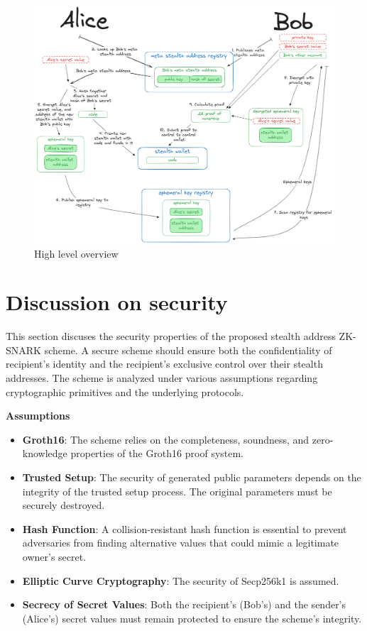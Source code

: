 \documentclass[conference,comsoc,10pt]{IEEEtran}
\begin{document}
    \begin{figure}[h]
        \centering
        \includegraphics[scale=0.11]{../bachelor/assets/images/high-level-flow.png}
        \caption{High level overview}
        \label{fig:high-level-flow}
    \end{figure}

\section{Discussion on security}

    This section discuses the security properties of the proposed stealth address
    ZK-SNARK scheme. A secure scheme should ensure both the confidentiality
    of recipient's identity and the recipient's exclusive control over their
    stealth addresses. The scheme is analyzed under various assumptions
    regarding cryptographic primitives and the underlying protocols.

    \textbf{Assumptions}
    \begin{itemize}
        \item \textbf{Groth16}: The scheme relies on the completeness, soundness,
            and zero-knowledge properties of the Groth16 proof system.
        \item \textbf{Trusted Setup}: The security of generated public parameters
            depends on the integrity of the trusted setup process. The original
            parameters must be securely destroyed.
        \item \textbf{Hash Function}: A collision-resistant hash function is
            essential to prevent adversaries from finding alternative values
            that could mimic a legitimate owner's secret.
        \item \textbf{Elliptic Curve Cryptography}: The security of Secp256k1 is
            assumed.
        \item \textbf{Secrecy of Secret Values}: Both the recipient's (Bob's)
            and the sender's (Alice's) secret values must remain protected
            to ensure the scheme's integrity.
    \end{itemize}
\end{document}
